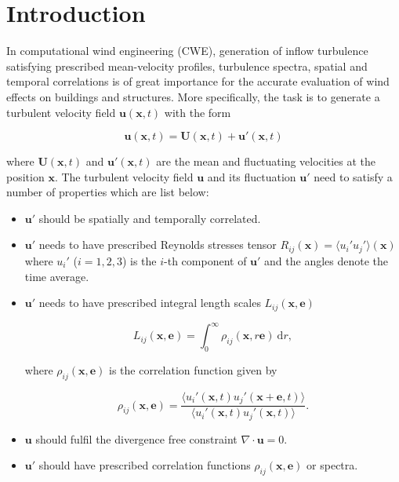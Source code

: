 \section{Introduction}
\label{sec:TInF-theory}

In computational wind engineering (CWE), generation of inflow turbulence satisfying prescribed mean-velocity profiles, turbulence spectra, spatial and temporal correlations is of great importance for the accurate evaluation of wind effects on buildings and structures. More specifically, the task is to generate a turbulent velocity field $\boldsymbol{u}(\boldsymbol{x},t)$ with the form

\begin{equation}
\boldsymbol{u}(\boldsymbol{x},t) = \boldsymbol{U}(\boldsymbol{x},t)+\boldsymbol{u}'(\boldsymbol{x},t)
\end{equation}

\noindent where $\boldsymbol{U}(\boldsymbol{x},t)$ and $\boldsymbol{u}'(\boldsymbol{x},t)$ are the mean and fluctuating velocities at the position $\boldsymbol{x}$. The turbulent velocity field $\boldsymbol{u}$ and its fluctuation $\boldsymbol{u}'$ need to satisfy a number of properties which are list below:

\begin{itemize}

\item $\boldsymbol{u}'$ should be spatially and temporally correlated.

\item $\boldsymbol{u}'$ needs to have prescribed Reynolds stresses tensor $R_{ij}(\boldsymbol{x}) = \langle u_i'u_j'\rangle(\boldsymbol{x})$ where $u_i'$ ($i=1,2,3$) is the $i$-th component of $\boldsymbol{u}'$  and the angles denote the time average.

\item $\boldsymbol{u}'$ needs to have prescribed integral length scales $L_{ij}(\boldsymbol{x},\boldsymbol{e})$

\begin{equation}
L_{ij}(\boldsymbol{x},\boldsymbol{e}) = \int_{0}^{\infty} \rho_{ij}(\boldsymbol{x},r\boldsymbol{e})\ \mathrm{d}r,
\end{equation}

\noindent where $\rho_{ij}(\boldsymbol{x},\boldsymbol{e})$ is the correlation function given by

\begin{equation}
\rho_{ij}(\boldsymbol{x},\boldsymbol{e}) = \frac{\langle u_i'(\boldsymbol{x},t)u_j'(\boldsymbol{x}+\boldsymbol{e},t)\rangle}{\langle u_i'(\boldsymbol{x},t)u_j'(\boldsymbol{x},t) \rangle}.
\end{equation}

\item $\boldsymbol{u}$ should fulfil the divergence free constraint $\nabla \cdot \boldsymbol{u} = 0$.

\item $\boldsymbol{u}'$ should have prescribed correlation functions $\rho_{ij}(\boldsymbol{x},\boldsymbol{e})$ or spectra.

\end{itemize}


